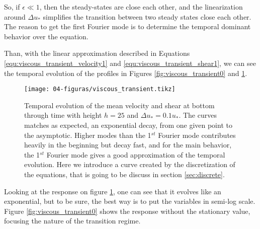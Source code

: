     So, if $\epsilon \ll 1$, then the steady-states are close each other, and the linearization around $\Delta u_*$ simplifies the transition between two steady states close each other. The reason to get the first Fourier mode is to determine the temporal dominant behavior over the equation.

    Than, with the linear approximation described in Equations \ref{equ:viscous_transient_velocity1} and \ref{equ:viscous_transient_shear1}, we can see the temporal evolution of the profiles in Figures \ref{fig:viscous_transient0} and \ref{fig:viscous_transient}.

\begin{figure}[H]
    \centering
    \texttt{[image: 04-figuras/viscous\_transient.tikz]}
    \caption[Temporal solution for viscous fluid profiles.]{Temporal evolution of the mean velocity and shear at bottom through time with height $h=25$ and $\Delta u_*=0.1 u_*$. The curves matches as expected, an exponential decay, from one given point to the asymptotic. Higher modes than the 1$^{st}$ Fourier mode contributes heavily in the beginning but decay fast, and for the main behavior, the 1$^{st}$ Fourier mode gives a good approximation of the temporal evolution. Here we introduce a curve created by the discretization of the equations, that is going to be discuss in section \ref{sec:discrete}.}
    \label{fig:viscous_transient}
\end{figure}

    Looking at the response on figure \ref{fig:viscous_transient}, one can see that it evolves like an exponential, but to be sure, the best way is to put the variables in semi-log scale. Figure \ref{fig:viscous_transient0} shows the response without the stationary value, focusing the nature of the transition regime.

